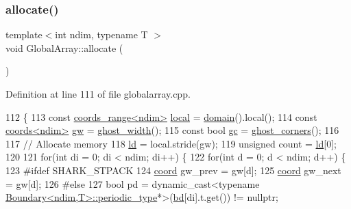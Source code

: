 \subsubsection{\texorpdfstring{allocate()}{allocate()}}
{\footnotesize\ttfamily template$<$int ndim, typename T $>$ \\
void Global\+Array\+::allocate (\begin{DoxyParamCaption}{ }\end{DoxyParamCaption})\hspace{0.3cm}{\ttfamily [private]}}



Definition at line 111 of file globalarray.\+cpp.


\begin{DoxyCode}
112 \{
113     \textcolor{keyword}{const} \hyperlink{structshark_1_1ndim_1_1coords__range}{coords\_range<ndim>} \hyperlink{classshark_1_1ndim_1_1_global_array_a871fb1acbd9bd46439766121053e20d1}{local} = \hyperlink{classshark_1_1ndim_1_1_global_array_a435ee8ff23c3feadf2ef2be64d4f375c}{domain}().local();
114     \textcolor{keyword}{const} \hyperlink{structshark_1_1ndim_1_1coords}{coords<ndim>} \hyperlink{classshark_1_1ndim_1_1_global_array_a38d93d114d585e5e5491c5ecd35c6bfc}{gw} = \hyperlink{classshark_1_1ndim_1_1_global_array_a5331f21887f3c14791b758e99656a676}{ghost\_width}();
115     \textcolor{keyword}{const} \textcolor{keywordtype}{bool} \hyperlink{classshark_1_1ndim_1_1_global_array_a100f4d523420deffde330079df7501e2}{gc} = \hyperlink{classshark_1_1ndim_1_1_global_array_abf0c9312657087578f89e1279ee6c451}{ghost\_corners}(); 
116 
117     \textcolor{comment}{// Allocate memory}
118     \hyperlink{classshark_1_1ndim_1_1_global_array_afdc4665e0fde4a703785436af351df49}{ld} = local.stride(gw);
119         \textcolor{keywordtype}{unsigned} count = \hyperlink{classshark_1_1ndim_1_1_global_array_afdc4665e0fde4a703785436af351df49}{ld}[0];
120 
121     \textcolor{keywordflow}{for}(\textcolor{keywordtype}{int} di = 0; di < ndim; di++) \{
122         \textcolor{keywordflow}{for}(\textcolor{keywordtype}{int} d = 0; d < ndim; d++) \{
123 \textcolor{preprocessor}{#ifdef SHARK\_STPACK}
124                         \hyperlink{namespaceshark_a767a92d5dd82cb82266473bff42fa6d9}{coord} gw\_prev = gw[d];
125                         \hyperlink{namespaceshark_a767a92d5dd82cb82266473bff42fa6d9}{coord} gw\_next = gw[d];
126 \textcolor{preprocessor}{#else}
127                         \textcolor{keywordtype}{bool} pd = \textcolor{keyword}{dynamic\_cast<}typename 
      \hyperlink{classshark_1_1ndim_1_1_boundary_1_1periodic__type}{Boundary<ndim,T>::periodic\_type}*\textcolor{keyword}{>}(\hyperlink{classshark_1_1ndim_1_1_global_array_aead89700a3d1d960432c6dc971251a9c}{bd}[di].t.get()) != \textcolor{keyword}{nullptr};

\end{DoxyCode}
